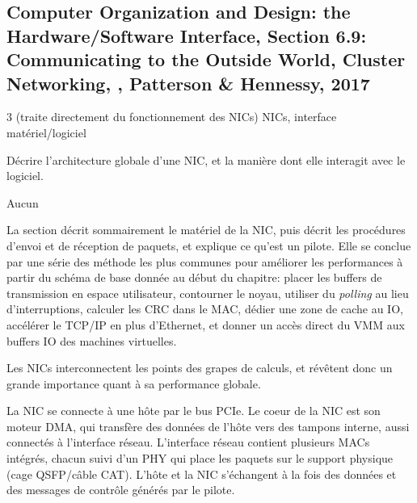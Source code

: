 
\subsection{Computer Organization and Design: the Hardware/Software Interface, Section 6.9: Communicating to the Outside World, Cluster Networking, \cite{patterson_computer_2017}, Patterson \& Hennessy, 2017}

 3 (traite directement du fonctionnement des NICs)
 NICs, interface matériel/logiciel

 Décrire l'architecture globale d'une NIC, et la manière dont elle interagit avec le logiciel.

 Aucun

 La section décrit sommairement le matériel de la NIC, puis décrit les procédures d'envoi et de réception de paquets, et explique ce qu'est un pilote. Elle se conclue par une série des méthode les plus communes pour améliorer les performances à partir du schéma de base donnée au début du chapitre: placer les buffers de transmission en espace utilisateur, contourner le noyau, utiliser du \emph{polling} au lieu d'interruptions, calculer les CRC dans le MAC, dédier une zone de cache au IO, accélérer le TCP/IP en plus d'Ethernet, et donner un accès direct du VMM aux buffers IO des machines virtuelles.


Les NICs interconnectent les points des grapes de calculs, et révêtent donc un grande importance quant à sa performance globale.


La NIC se connecte à une hôte par le bus PCIe. Le coeur de la NIC est son moteur DMA, qui transfère des données de l'hôte vers des tampons interne, aussi connectés à l'interface réseau. L'interface réseau contient plusieurs MACs intégrés, chacun suivi d'un PHY qui place les paquets sur le support physique (cage QSFP/câble CAT). L'hôte et la NIC s'échangent à la fois des données et des messages de contrôle générés par le pilote.



